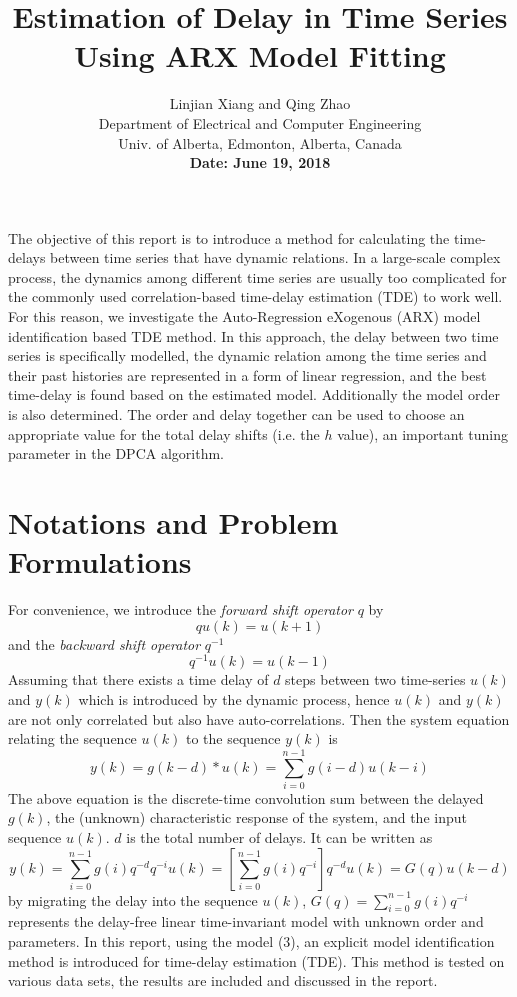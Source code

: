 \documentclass[letterpaper, 12 pt, Journal, onecolumn]{ieeeconf}  %
\title{\Large \bf
	Estimation of Delay in Time Series Using ARX Model Fitting
}
\author{\begin{tabular}{c}
		Linjian Xiang and Qing Zhao\\
		Department of Electrical and Computer Engineering \\
		Univ. of Alberta, Edmonton, Alberta, Canada\\
		\textbf{Date: June 19, 2018}
	\end{tabular}
}
\begin{document}
	\maketitle
	\thispagestyle{empty}
	\pagestyle{empty}
The objective of this report is to introduce a method for calculating the time-delays between time series that have dynamic relations. In a large-scale complex process, the dynamics among different time series are usually too complicated for the commonly used correlation-based time-delay estimation (TDE) to work well. For this reason, we investigate the Auto-Regression eXogenous (ARX) model identification based TDE method. In this approach, the delay between two time series is specifically modelled, the dynamic relation among the time series and their past histories are represented in a form of linear regression, and the best time-delay is found based on the estimated model. Additionally the model order is also determined. The order and delay together can be used to choose an appropriate value for the total delay shifts (i.e. the $h$ value), an important tuning parameter in the DPCA algorithm.\\

\section{Notations and Problem Formulations}

For convenience, we introduce the \textit{forward shift operator} $q$ by
\begin{equation}
qu(k) = u(k+1)
\end{equation}
and the \textit{backward shift operator} $q^{-1}$
\begin{equation}
q^{-1}u(k) = u(k-1)
\end{equation}
Assuming that there exists a time delay of $d$ steps between two time-series $u(k)$ and $y(k)$ which is introduced by the dynamic process, hence $u(k)$ and $y(k)$ are not only correlated but also have auto-correlations. Then the system equation relating the sequence $u(k)$ to the sequence $y(k)$ is
$$y(k)=g(k-d)\ast u(k)=\sum\limits_{i=0}^{n-1} g(i-d)u(k-i)$$
The above equation is the discrete-time convolution sum between the delayed $g(k)$, the (unknown) characteristic response of the system, and the input sequence $u(k)$. $d$ is the total number of delays. It can be written as
\begin{equation}
y(k) = \sum\limits_{i=0}^{n-1} g(i)q^{-d}q^{-i}u(k) = \left[\sum\limits_{i=0}^{n-1}g(i)q^{-i}\right]q^{-d}u(k) =G(q)u(k-d)
\end{equation}
by migrating the delay into the sequence $u(k)$, $G(q) =\sum\limits_{i=0}^{n-1}g(i)q^{-i}$ represents the delay-free linear time-invariant model with unknown order and parameters. In this report, using the model (3), an explicit model identification method is introduced for time-delay estimation (TDE). 
This method is tested on various data sets, the results are included and discussed in the report.
\end{document}
